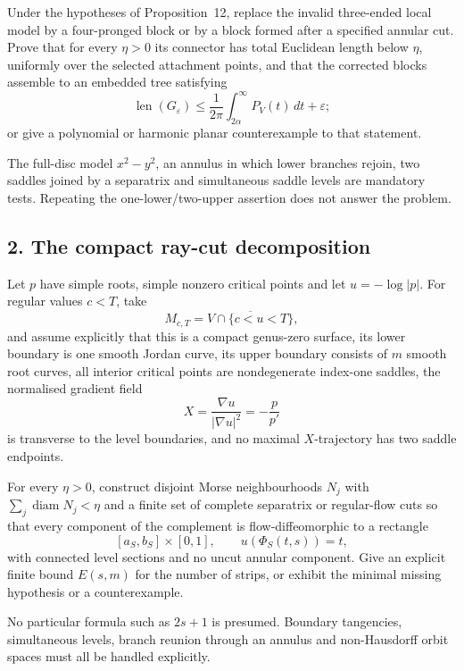 \begin{problem}\label{prob:saddle1041}
Under the hypotheses of Proposition~12, replace the invalid three-ended local
model by a four-pronged block or by a block formed after a specified annular
cut.  Prove that for every $\eta>0$ its connector has total Euclidean length
below $\eta$, uniformly over the selected attachment points, and that the
corrected blocks assemble to an embedded tree satisfying
\[
 \operatorname{len}(G_\varepsilon)
 \le\frac1{2\pi}\int_{2\alpha}^{\infty}P_V(t)\,dt+\varepsilon;
\]
or give a polynomial or harmonic planar counterexample to that statement.
\end{problem}

The full-disc model $x^2-y^2$, an annulus in which lower branches rejoin, two
saddles joined by a separatrix and simultaneous saddle levels are mandatory
tests.  Repeating the one-lower/two-upper assertion does not answer the
problem.

\subsection*{2. The compact ray-cut decomposition}

Let $p$ have simple roots, simple nonzero critical points and let
$u=-\log|p|$.  For regular values $c<T$, take
\[
 M_{c,T}=\overline{V\cap\{c<u<T\}},
\]
and assume explicitly that this is a compact genus-zero surface, its lower
boundary is one smooth Jordan curve, its upper boundary consists of $m$ smooth
root curves, all interior critical points are nondegenerate index-one saddles,
the normalised gradient field
\[
 X=\frac{\nabla u}{|\nabla u|^2}=-\frac{p}{p'}
\]
is transverse to the level boundaries, and no maximal $X$-trajectory has two
saddle endpoints.

\begin{problem}\label{prob:reeb1041}
For every $\eta>0$, construct disjoint Morse neighbourhoods $N_j$ with
$\sum_j\operatorname{diam}N_j<\eta$ and a finite set of complete separatrix or
regular-flow cuts so that every component of the complement is flow-diffeomorphic
to a rectangle
\[
 [a_S,b_S]\times[0,1],\qquad u(\Phi_S(t,s))=t,
\]
with connected level sections and no uncut annular component.  Give an explicit
finite bound $E(s,m)$ for the number of strips, or exhibit the minimal missing
hypothesis or a counterexample.
\end{problem}

No particular formula such as $2s+1$ is presumed.  Boundary tangencies,
simultaneous levels, branch reunion through an annulus and non-Hausdorff orbit
spaces must all be handled explicitly.

